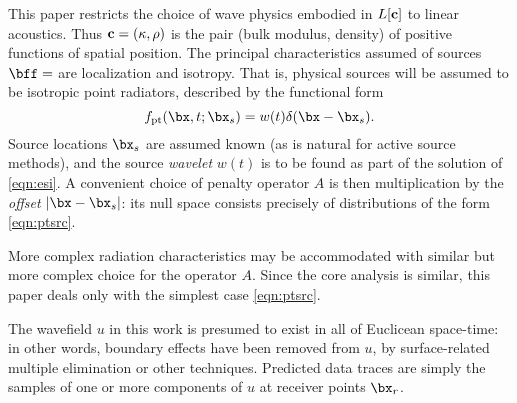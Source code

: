 This paper restricts the choice of wave physics embodied in
$L[\bf{c}]$ to linear acoustics.  Thus $\bf{c}=(\kappa,\rho)$ is the
pair (bulk modulus, density) of positive functions of spatial
position. The principal characteristics assumed of sources $\bff=$ are localization and isotropy. That is, physical sources will be assumed to be isotropic point radiators, described by the functional form
\begin{equation}
\label{eqn:ptsrc}
f_{\rm pt}(\bx,t;\bx_s) = w(t)\delta(\bx-\bx_s). 
\end{equation}
Source locations $\bx_s$ are assumed known (as is natural for active source methods), and the source {\em wavelet} $w(t)$ is to be found as part of the solution of \ref{eqn:esi}. A convenient choice of penalty operator $A$ is then multiplication by the {\em offset} $|\bx-\bx_s|$: its null space consists precisely of distributions of the form \ref{eqn:ptsrc}. 

More complex radiation characteristics may be accommodated with similar but more complex choice for the operator $A$. Since the core analysis is similar, this paper deals only with the simplest case \ref{eqn:ptsrc}.

The wavefield $u$ in this work is presumed to exist in all of Euclicean space-time: in other words, boundary effects have been removed from $u$, by surface-related multiple elimination or other techniques. Predicted data traces are simply the samples of one or more components of $u$ at receiver points $\bx_r$.


